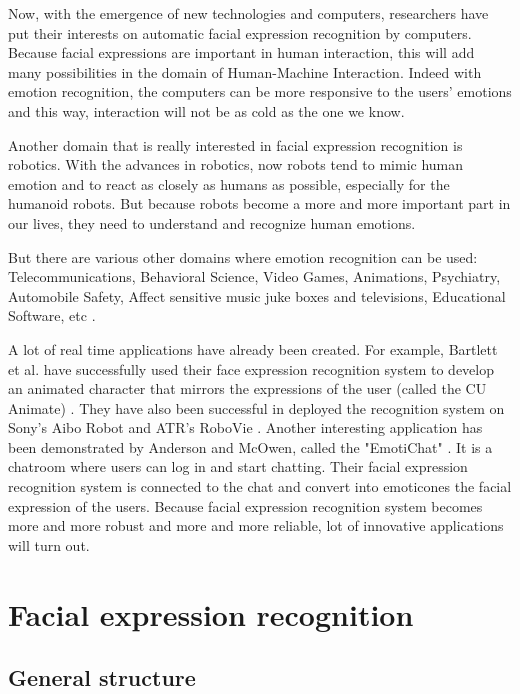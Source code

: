 \noindent Now, with the emergence of new technologies and computers, researchers have put their interests on automatic facial expression recognition by computers. Because facial expressions are important in human interaction, this will add many possibilities in the domain of Human-Machine Interaction. Indeed with emotion recognition, the computers can be more responsive to the users' emotions and this way, interaction will not be as cold as the one we know. 
\newline

\noindent Another domain that is really interested in facial expression recognition is robotics. With the advances in robotics, now robots tend to mimic human emotion and to react as closely as humans as possible, especially for the humanoid robots. But because robots become a more and more important part in our lives, they need to understand and recognize human emotions.
\newline

\noindent But there are various other domains where emotion recognition can be used: Telecommunications, Behavioral Science, Video Games, Animations, Psychiatry, Automobile Safety, Affect sensitive music juke boxes and televisions, Educational Software, etc \cite{BET12}.
\newline

\noindent A lot of real time applications have already been created. For example, Bartlett et al. have successfully used their face expression recognition system to develop an animated character that mirrors the expressions of the user (called the CU Animate) \cite{BAR03}. They have also been successful in deployed the recognition system on Sony's Aibo Robot and ATR's RoboVie \cite{BAR03}. Another interesting application has been demonstrated by Anderson and McOwen, called the "EmotiChat" \cite{AND06}. It is a chatroom where users can log in and start chatting. Their facial expression recognition system is connected to the chat and convert into emoticones the facial expression of the users. Because facial expression recognition system becomes more and more robust and more and more reliable, lot of innovative applications will turn out.
\newpage

\chapter{Facial expression recognition}

\section{General structure}

